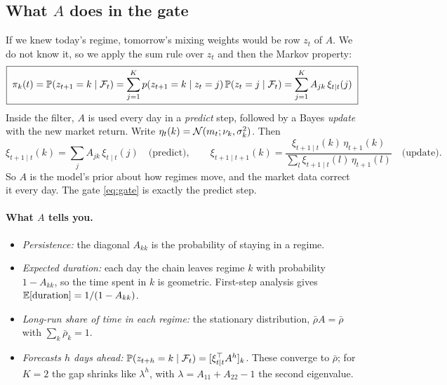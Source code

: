 \subsection{What $A$ does in the gate}

If we knew today's regime, tomorrow's mixing weights would be row $z_t$ of $A$. We do not know it, so we apply the sum rule over $z_t$ and then the Markov property:
\begin{equation}\label{eq:gate}
\boxed{\;\pi_k(t)=\mathbb P(z_{t+1}=k\mid\mathcal{F}_t)=\sum_{j=1}^Kp(z_{t+1}=k\mid z_t=j)\,\mathbb P(z_t=j\mid\mathcal{F}_t)=\sum_{j=1}^KA_{jk}\,\xi_{t\mid t}(j)\;}
\end{equation}
Inside the filter, $A$ is used every day in a \emph{predict} step, followed by a Bayes \emph{update} with the new market return. Write $\eta_{t}(k)=\mathcal{N}(m_{t};\nu_k,\sigma_k^2)$. Then
\begin{equation}
\xi_{t+1\mid t}(k)=\sum_jA_{jk}\,\xi_{t\mid t}(j)\quad\text{(predict)},\qquad\xi_{t+1\mid t+1}(k)=\frac{\xi_{t+1\mid t}(k)\,\eta_{t+1}(k)}{\sum_l\xi_{t+1\mid t}(l)\,\eta_{t+1}(l)}\quad\text{(update)}.
\end{equation}
So $A$ is the model's prior about how regimes move, and the market data correct it every day. The gate \eqref{eq:gate} is exactly the predict step.

\paragraph{What $A$ tells you.}
\begin{itemize}
  \item \emph{Persistence:} the diagonal $A_{kk}$ is the probability of staying in a regime.
  \item \emph{Expected duration:} each day the chain leaves regime $k$ with probability $1-A_{kk}$, so the time spent in $k$ is geometric. First-step analysis gives $\mathbb{E}[\text{duration}]=1/(1-A_{kk})$.
  \item \emph{Long-run share of time in each regime:} the stationary distribution, $\bar\rho A=\bar\rho$ with $\sum_k\bar\rho_k=1$.
  \item \emph{Forecasts $h$ days ahead:} $\mathbb P(z_{t+h}=k\mid\mathcal{F}_t)=[\xi_{t\mid t}^{\top} A^h]_k$. These converge to $\bar\rho$; for $K=2$ the gap shrinks like $\lambda^h$, with $\lambda=A_{11}+A_{22}-1$ the second eigenvalue.
\end{itemize}


